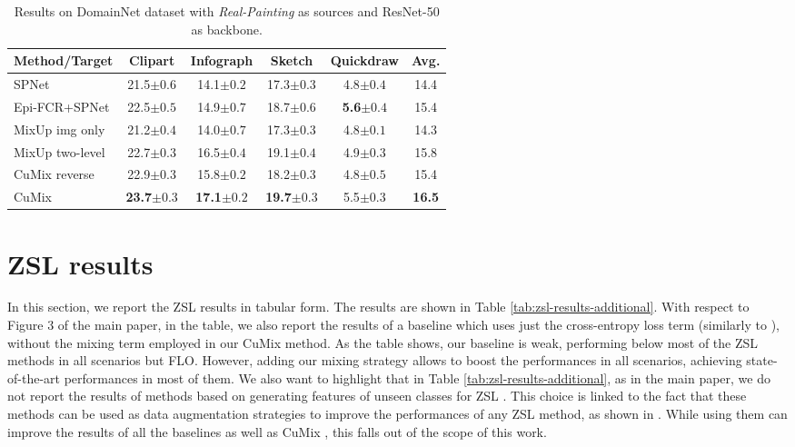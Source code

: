 \documentclass[runningheads]{llncs}
\newcommand{\methodName}{{CuMix} }
\begin{document}
 \begin{table*}[t]
           \label{tab:ablation-zsldg}
 			\caption{Results on DomainNet dataset with \textit{Real-Painting} as sources and ResNet-50 as backbone.} 
 			 		\centering
 		\begin{tabular}{ l | c  c  c  c | c}
 		Method/Target & Clipart& Infograph& Sketch& Quickdraw& Avg.\\\hline 
 SPNet& 21.5$\pm{0.6}$& 14.1$\pm{0.2}$& 17.3$\pm{0.3}$& 4.8$\pm{0.4}$& 14.4\\
 Epi-FCR+SPNet& 22.5$\pm{0.5}$& 14.9$\pm{0.7}$& 18.7$\pm{0.6}$& \textbf{5.6}$\pm{0.4}$& 15.4\\
 \hline
 MixUp img only & 21.2$\pm{0.4}$& 14.0$\pm{0.7}$& 17.3$\pm{0.3}$& 4.8$\pm{0.1}$& 14.3\\
 MixUp two-level& 22.7$\pm{0.3}$& 16.5$\pm{0.4}$& 19.1$\pm{0.4}$& 4.9$\pm{0.3}$& 15.8\\
 CuMix reverse& 22.9$\pm{0.3}$& 15.8$\pm{0.2}$& 18.2$\pm{0.3}$& 4.8$\pm{0.5}$& 15.4\\
 \hline
 CuMix & \textbf{23.7$\pm{0.3}$}& \textbf{17.1$\pm{0.2}$}& \textbf{19.7$\pm 0.3$}& {5.5$\pm{0.3}$}& \textbf{16.5} \\
 		\end{tabular}
 		\label{tab:ablation-study-pacs}
 \end{table*}
 


\section{ZSL results}
In this section, we report the ZSL results in tabular form. The results are shown in Table \ref{tab:zsl-results-additional}. With respect to Figure 3 of the main paper, in the table, we also report the results of a baseline which uses just the cross-entropy loss term (similarly to \cite{xian2019semantic}), without the mixing term employed in our \methodName method. As the table shows, our baseline is weak, performing below most of the ZSL methods in all scenarios but FLO. However, adding our mixing strategy allows to boost the performances in all scenarios, achieving state-of-the-art performances in most of them. We also want to highlight that in Table \ref{tab:zsl-results-additional}, as in the main paper, we do not report the results of methods based on generating features of unseen classes for ZSL \cite{xian2018feature,xian2019fvaegan}. This choice is linked to the fact that these methods can be used as data augmentation strategies to improve the performances of any ZSL method, as shown in \cite{xian2018feature}. While using them can improve the results of all the baselines as well as \methodName, this falls out of the scope of this work.
\end{document}
